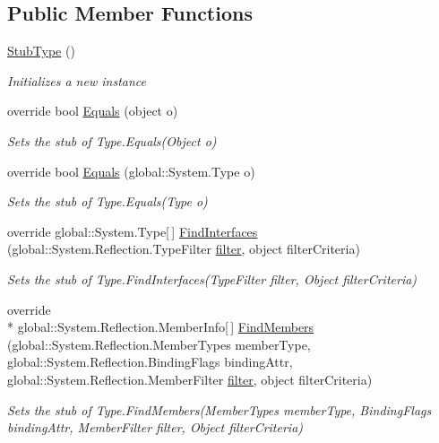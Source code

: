 \subsection*{Public Member Functions}
\begin{DoxyCompactItemize}
\item 
\hyperlink{class_system_1_1_fakes_1_1_stub_type_a285d22684e374ab6ec141d1719e85043}{Stub\-Type} ()
\begin{DoxyCompactList}\small\item\em Initializes a new instance\end{DoxyCompactList}\item 
override bool \hyperlink{class_system_1_1_fakes_1_1_stub_type_a45b659fcabacd75d04b3696ce9bee38c}{Equals} (object o)
\begin{DoxyCompactList}\small\item\em Sets the stub of Type.\-Equals(\-Object o)\end{DoxyCompactList}\item 
override bool \hyperlink{class_system_1_1_fakes_1_1_stub_type_acc606597ccf55bfa7de573c64ccb58f6}{Equals} (global\-::\-System.\-Type o)
\begin{DoxyCompactList}\small\item\em Sets the stub of Type.\-Equals(\-Type o)\end{DoxyCompactList}\item 
override global\-::\-System.\-Type\mbox{[}$\,$\mbox{]} \hyperlink{class_system_1_1_fakes_1_1_stub_type_a9bd2b58bf73db8b8fe3561549df9cc5f}{Find\-Interfaces} (global\-::\-System.\-Reflection.\-Type\-Filter \hyperlink{jquery-1_810_82-vsdoc_8js_ac99d0cf56cab46114f5765a14e03ad6d}{filter}, object filter\-Criteria)
\begin{DoxyCompactList}\small\item\em Sets the stub of Type.\-Find\-Interfaces(\-Type\-Filter filter, Object filter\-Criteria)\end{DoxyCompactList}\item 
override \\*
global\-::\-System.\-Reflection.\-Member\-Info\mbox{[}$\,$\mbox{]} \hyperlink{class_system_1_1_fakes_1_1_stub_type_abf955e26f3593adce8db14b3a389a69a}{Find\-Members} (global\-::\-System.\-Reflection.\-Member\-Types member\-Type, global\-::\-System.\-Reflection.\-Binding\-Flags binding\-Attr, global\-::\-System.\-Reflection.\-Member\-Filter \hyperlink{jquery-1_810_82-vsdoc_8js_ac99d0cf56cab46114f5765a14e03ad6d}{filter}, object filter\-Criteria)
\begin{DoxyCompactList}\small\item\em Sets the stub of Type.\-Find\-Members(\-Member\-Types member\-Type, Binding\-Flags binding\-Attr, Member\-Filter filter, Object filter\-Criteria)\end{DoxyCompactList}\item 

\end{DoxyCompactItemize}
